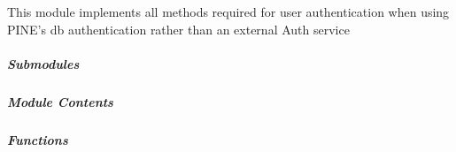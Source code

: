 \documentclass[letterpaper,10pt,english]{sphinxmanual}
\begin{document}
This module implements all methods required for user authentication when using PINE’s db authentication rather than
an external Auth service



\subparagraph{Submodules}
\label{\detokenize{autoapi/pine/backend/admin/index:submodules}}

\subparagraph{}
\label{\detokenize{autoapi/pine/backend/admin/bp/index:module-pine.backend.admin.bp}}\label{\detokenize{autoapi/pine/backend/admin/bp/index:pine-backend-admin-bp}}\label{\detokenize{autoapi/pine/backend/admin/bp/index::doc}}

\subparagraph{Module Contents}
\label{\detokenize{autoapi/pine/backend/admin/bp/index:module-contents}}

\subparagraph{Functions}
\label{\detokenize{autoapi/pine/backend/admin/bp/index:functions}}
\end{document}
